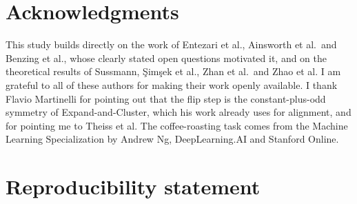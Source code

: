 \documentclass[11pt]{article}
\begin{document}
\section*{Acknowledgments}

This study builds directly on the work of Entezari et al., Ainsworth et al.\ and Benzing et al., whose clearly stated open questions motivated it, and on the theoretical results of Sussmann, Şimşek et al., Zhan et al.\ and Zhao et al. I am grateful to all of these authors for making their work openly available. I thank Flavio Martinelli for pointing out that the flip step is the constant-plus-odd symmetry of Expand-and-Cluster, which his work already uses for alignment, and for pointing me to Theiss et al. The coffee-roasting task comes from the Machine Learning Specialization by Andrew Ng, DeepLearning.AI and Stanford Online.

\section*{Reproducibility statement}
\label{sec:repro}
\end{document}
